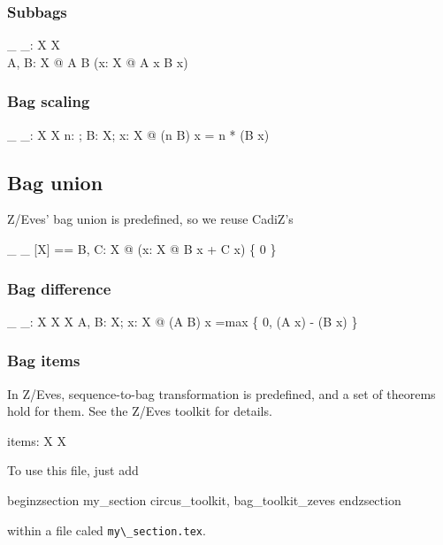 \documentclass[draft,a4paper,10pt,wd]{article}
\begin{document}
\subsubsection*{Subbags}

\begin{gendef}[X]
  \_ \subbageq \_: \bag X \rel \bag X \\
\where
  \forall A, B: \bag X @ A \subbageq B \iff
	(\forall x: X @ A \bcount x \leq B \bcount x)
\end{gendef}

\subsubsection*{Bag scaling}

\begin{gendef}[X]
  \_ \otimes \_: \nat \cross \bag X \fun \bag X
\where
  \forall n: \nat; B: \bag X; x: X @
     (n \otimes B) \bcount x = n * (B \bcount x)
\end{gendef}

\subsection*{Bag union }

Z/Eves' bag union is predefined, so we reuse CadiZ's
\begin{zed}
\_ \uplus \_ [X] == \lambda B, C: \bag X @ (\lambda x: X @ B \bcount x + C \bcount x) \nrres \{ 0 \}
\end{zed}

\subsubsection*{Bag difference}

\begin{gendef}[X]
  \_ \uminus \_: \bag X \cross \bag X \fun \bag X
\where
  \forall A, B: \bag X; x: X @
     (A \uminus B) \bcount x =max \{ 0, (A \bcount x) - (B \bcount x) \}
\end{gendef}

\subsubsection*{Bag items}

In Z/Eves, sequence-to-bag transformation is predefined, and a set
of theorems hold for them. See the Z/Eves toolkit for details.
%
\begin{gendef}[X]
  items: \seq X \fun \bag X
\end{gendef}

To use this file, just add

begin{zsection}
\SECTION my\_section \parents circus\_toolkit, bag\_toolkit\_zeves
end{zsection}

within a file caled \verb'my\_section.tex'.
\end{document}
